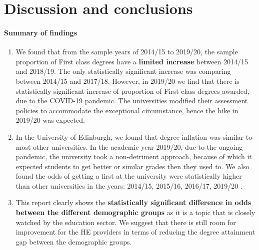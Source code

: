 \documentclass[11pt,a4paper]{article}
\begin{document}
\section{Discussion and conclusions}

\paragraph{Summary of findings}
\begin{enumerate}
    \item We found that from the sample years of 2014/15 to 2019/20, the sample proportion of First class degrees have a \textbf{limited increase} between 2014/15 and 2018/19. The only statistically significant increase was comparing between 2014/15 and 2017/18. However, in 2019/20 we find that there is statistically significant increase of proportion of First class degrees awarded, due to the COVID-19 pandemic. The universities modified their assessment policies to accommodate the exceptional circumstance, hence the hike in 2019/20 was expected.
    \item In the University of Edinburgh, we found that degree inflation was similar to most other universities. In the academic year 2019/20, due to the ongoing pandemic, the university took a non-detriment approach, because of which it expected students to get better or similar grades then they used to. We also found the odds of getting a first at the university were statistically higher than other universities in the years: 2014/15, 2015/16, 2016/17, 2019/20 .  
    \item This report clearly shows  the \textbf{statistically significant difference in odds between the different demographic groups} as it is a topic that is closely watched by the education sector. We suggest that there is still room for improvement for the HE providers in terms of reducing the degree attainment gap between the demographic groups.
\end{enumerate}
\end{document}
